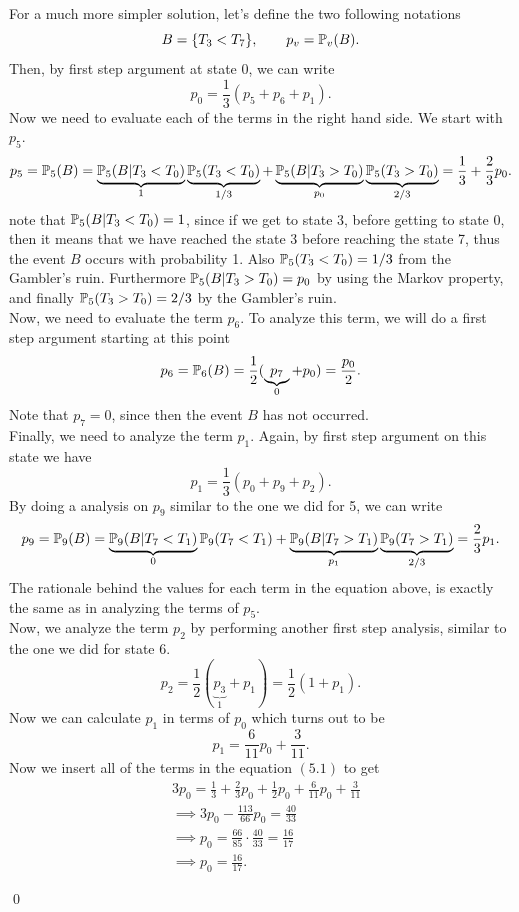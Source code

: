 \begin{solution}
	For a much more simpler solution, let's define the two following notations
	\[ B = \{T_3 < T_7\}, \qquad p_v = \mathbb{P}_v(B). \]
	Then, by first step argument at state $0$, we can write
	\[ p_0 = \frac{1}{3} (p_5 + p_6 + p_1).  \tag{5.1}\]
	Now we need to evaluate each of the terms in the right hand side. We start with $p_5$.
	\[ p_5 = \mathbb{P}_5(B) = \underbrace{\mathbb{P}_5(B|T_3<T_0)}_{1}\underbrace{\mathbb{P}_5(T_3<T_0)}_{1/3} + \underbrace{\mathbb{P}_5(B|T_3>T_0)}_{p_0}\underbrace{\mathbb{P}_5(T_3>T_0)}_{2/3} = \frac{1}{3} + \frac{2}{3}p_0. \]
	note that $\mathbb{P}_5(B|T_3<T_0) = 1$, since if we get to state 3, before getting to state 0, then it means that we have reached the state 3 before reaching the state 7, thus the event $B$ occurs with probability 1. Also $\mathbb{P}_5(T_3<T_0) = 1/3$ from the Gambler's ruin. Furthermore $\mathbb{P}_5(B|T_3>T_0) = p_0$ by using the Markov property, and finally $\mathbb{P}_5(T_3>T_0) = 2/3$ by the Gambler's ruin. \\
	Now, we need to evaluate the term $p_6$. To analyze this term, we will do a first step argument starting at this point
	\[ p_6 = \mathbb{P}_6(B) = \frac{1}{2}(\underbrace{p_7}_{0} + p_0) = \frac{p_0}{2}. \]
	Note that $p_7 = 0$, since then the event $B$ has not occurred. \\
	Finally, we need to analyze the term $p_1$. Again, by first step argument on this state we have
	\[ p_1 = \frac{1}{3}(p_0 + p_9 + p_2). \]	
	By doing a analysis on $p_9$ similar to the one we did for 5, we can write
	\[ p_9 = \mathbb{P}_9(B)= \underbrace{\mathbb{P}_9(B|T_7<T_1)}_{0}\mathbb{P}_9(T_7<T_1) + \underbrace{\mathbb{P}_9(B|T_7>T_1)}_{p_1}\underbrace{\mathbb{P}_9(T_7>T_1)}_{2/3} = \frac{2}{3}p_1. \]
	The rationale behind the values for each term in the equation above, is exactly the same as in analyzing the terms of $p_5$.\\
	Now, we analyze the term $p_2$ by performing another first step analysis, similar to the one we did for state 6.
	\[ p_2 = \frac{1}{2}(\underbrace{p_3}_1 + p_1) = \frac{1}{2}(1+p_1). \]
	Now we can calculate $p_1$ in terms of $p_0$ which turns out to be
	\[ p_1 = \frac{6}{11}p_0 + \frac{3}{11}.  \]
	Now we insert all of the terms in the equation $(5.1)$ to get
	\begin{align*}
		&3p_0 = \frac{1}{3}+\frac{2}{3}p_0 + \frac{1}{2}p_0 + \frac{6}{11}p_0 + \frac{3}{11} \\ 
		&\implies 3p_0 - \frac{113}{66}p_0 = \frac{40}{33} \\
		&\implies p_0 = \frac{66}{85}\cdot\frac{40}{33} = \frac{16}{17}\\
		&\implies \boxed{p_0 = \frac{16}{17}}.
	\end{align*}
	
	
	\qed
	
\end{solution}


